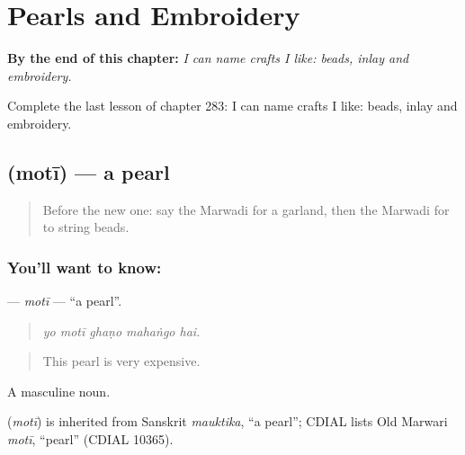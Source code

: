 
\chapter{Pearls and Embroidery}
\label{ch:mw-pearls-and-embroidery}

\begin{chapteropening}
\textbf{By the end of this chapter:} \emph{I can name crafts I like: beads, inlay and embroidery.}

Complete the last lesson of chapter 283: I can name crafts I like: beads, inlay and embroidery.
\end{chapteropening}

\section[\texorpdfstring{\mw{मोती} (motī)}{मोती (motī)}]{ (motī) — a pearl}

\label{lesson:MW-C283-moti}



\begin{quote}
Before the new one: say the Marwadi for a garland, then the Marwadi for to string beads.
\end{quote}

\subsection*{You'll want to know: }
\textbf{} — \emph{motī} — \textquotedblleft{}a pearl\textquotedblright{}.

\begin{quote}
    
\end{quote}

\begin{quote}
\emph{yo motī ghaṇo mahaṅgo hai.}
\end{quote}

\begin{quote}
This pearl is very expensive.
\end{quote}

A masculine noun.

\begin{cousinweb}
\textbf{} (\emph{motī}) is inherited from Sanskrit \emph{mauktika}, \textquotedblleft{}a pearl\textquotedblright{}; CDIAL lists Old Marwari \emph{motī}, \textquotedblleft{}pearl\textquotedblright{} (CDIAL 10365).
\end{cousinweb}


